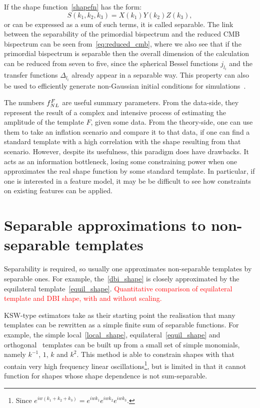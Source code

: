 If the shape function~\eqref{shapefn} has the form:
\begin{equation}\label{sepXYZ}
S(k_1,k_2,k_3) = X(k_1)Y(k_2)Z(k_3),
\end{equation}
or can be expressed as a sum of such terms,
it is called separable.
The link between the separability of the primordial bispectrum
and the reduced CMB bispectrum can be seen from~\eqref{eq:reduced_cmb},
where we also see that if the primordial bispectrum is separable
then the overall dimension
of the calculation can be reduced from seven to five, 
since the spherical Bessel functions $j_{l_i}$ and the
transfer functions $\Delta_{l_i}$ already appear in a separable way.
This property can also be used to
efficiently generate non-Gaussian initial conditions
for simulations~\cite{Scoccimarro_2012}.


The numbers $f_{NL}^F$ are useful summary parameters.
From the data-side, they represent the result of
a complex and intensive process
of estimating the amplitude of the template $F$,
given some data. From the theory-side, one
can use them to take an inflation scenario and compare it
to that data, if one can find a standard template
with a high correlation with the shape resulting
from that scenario.
However, despite its usefulness, this paradigm does
have drawbacks. It acts as an information bottleneck,
losing some constraining power when one approximates
the real shape function by some standard template.
In particular, if one is interested in a feature model,
it may be be difficult to see how constraints on existing
features can be applied.
    \section{Separable approximations to non-separable templates}
    Separability is required, so usually one approximates non-separable templates
    by separable ones.
    For example, the~\eqref{dbi_shape} is closely approximated by the equilateral
    template~\eqref{equil_shape}.
    \textcolor{red}{Quantitative comparison of equilateral template and DBI shape,
    with and without scaling.}


    KSW-type estimators take as their starting point the realisation that many
    templates can be rewritten as a simple finite sum of separable functions.
    For example, the simple local~\eqref{local_shape}, equilateral~\eqref{equil_shape} and orthogonal~\cite{Planck_NG_2013}
    templates can be built up from a small set of
    simple monomials, namely $k^{-1}$, $1$, $k$ and $k^{2}$.
    This method is able to constrain shapes with that contain very high frequency linear oscillations\footnote{
    Since $e^{iw(k_1+k_2+k_3)}=e^{iwk_1}e^{iwk_2}e^{iwk_3}$.},
    but is limited in that it cannot function for shapes whose shape dependence is not
    sum-separable.


